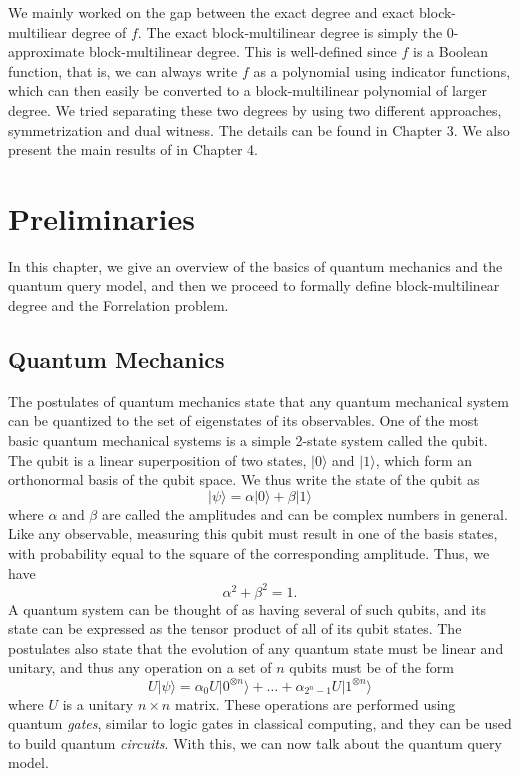 \documentclass[12pt]{report}
\begin{document}
We mainly worked on the gap between the exact degree and exact block-multiliear degree of $f$. The exact block-multilinear degree is simply the 0-approximate block-multilinear degree. This is well-defined since $f$ is a Boolean function, that is, we can always write $f$ as a polynomial using indicator functions, which can then easily be converted to a block-multilinear polynomial of larger degree. We tried separating these two degrees by using two different approaches, symmetrization and dual witness. The details can be found in Chapter 3. We also present the main results of \cite{paper1} in Chapter 4.

\chapter{Preliminaries}
In this chapter, we give an overview of the basics of quantum mechanics and the quantum query model, and then we proceed to formally define block-multilinear degree and the Forrelation problem.

\section{Quantum Mechanics}
The postulates of quantum mechanics state that any quantum mechanical system can be quantized to the set of eigenstates of its observables. One of the most basic quantum mechanical systems is a simple 2-state system called the qubit. The qubit is a linear superposition of two states, $|0\rangle$ and $|1\rangle$, which form an orthonormal basis of the qubit space. We thus write the state of the qubit as $$|\psi\rangle = \alpha|0\rangle + \beta|1\rangle$$ where $\alpha$ and $\beta$ are called the amplitudes and can be complex numbers in general. Like any observable, measuring this qubit must result in one of the basis states, with probability equal to the square of the corresponding amplitude. Thus, we have $$\alpha^2 + \beta^2 = 1.$$ A quantum system can be thought of as having several of such qubits, and its state can be expressed as the tensor product of all of its qubit states. The postulates also state that the evolution of any quantum state must be linear and unitary, and thus any operation on a set of $n$ qubits must be of the form $$U|\psi\rangle = \alpha_0 U|0^{\otimes n}\rangle + \ldots + \alpha_{2^n-1} U|1^{\otimes n}\rangle$$ where $U$ is a unitary $n \times n$ matrix. These operations are performed using quantum \textit{gates}, similar to logic gates in classical computing, and they can be used to build quantum \textit{circuits}. With this, we can now talk about the quantum query model.
\end{document}
